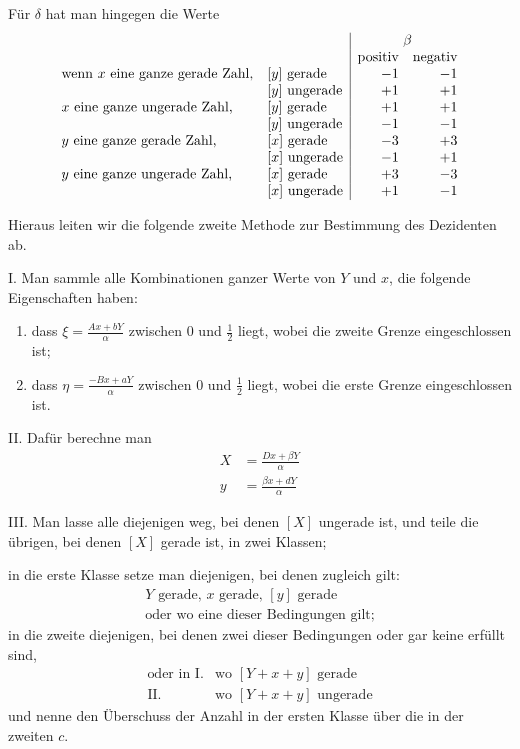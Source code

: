 Für $\delta$ hat man hingegen die Werte
\[
\begin{array}{ll|rr}
&&\multicolumn{2}{c}{\beta}\\
&&\text{positiv}&\text{negativ}\\
\text{wenn }x\text{ eine ganze gerade Zahl,}&[y]\text{ gerade}&-1&-1\\
&[y]\text{ ungerade}&+1&+1\\
x\text{ eine ganze ungerade Zahl,}&[y]\text{ gerade}&+1&+1\\
&[y]\text{ ungerade}&-1&-1\\
y\text{ eine ganze gerade Zahl,}&[x]\text{ gerade}&-3&+3\\
&[x]\text{ ungerade}&-1&+1\\
y\text{ eine ganze ungerade Zahl,}&[x]\text{ gerade}&+3&-3\\
&[x]\text{ ungerade}&+1&-1
\end{array}
\]

\clearpage{}
Hieraus leiten wir die folgende zweite Methode zur Bestimmung des Dezidenten ab.

I. Man sammle alle Kombinationen ganzer Werte von $Y$ und $x$, die folgende Eigenschaften haben:
\begin{enumerate}
\item dass $\xi=\frac{Ax+bY}{\alpha}$ zwischen $0$ und $\frac12$ liegt, wobei die zweite Grenze eingeschlossen ist;
\item dass $\eta=\frac{-Bx+aY}{\alpha}$ zwischen $0$ und $\frac12$ liegt, wobei die erste Grenze eingeschlossen ist.
\end{enumerate}

II. Dafür berechne man
\[
\begin{aligned}
X&=\frac{Dx+\beta Y}{\alpha}\\[3pt]
y&=\frac{\beta x+dY}{\alpha}
\end{aligned}
\]

III. Man lasse alle diejenigen weg, bei denen $[X]$ ungerade ist, und teile die übrigen, bei denen $[X]$ gerade ist, in zwei Klassen;

in die erste Klasse setze man diejenigen, bei denen zugleich gilt:
\[
\begin{array}{l}
Y\text{ gerade, }x\text{ gerade, }[y]\text{ gerade}\\
\text{oder wo eine dieser Bedingungen gilt;}
\end{array}
\]
in die zweite diejenigen, bei denen zwei dieser Bedingungen oder gar keine erfüllt sind,
\[
\begin{array}{rl}
\text{oder in I.}&\text{wo }[Y+x+y]\text{ gerade}\\
\text{II.}&\text{wo }[Y+x+y]\text{ ungerade}
\end{array}
\]
und nenne den Überschuss der Anzahl in der ersten Klasse über die in der zweiten $c$.

